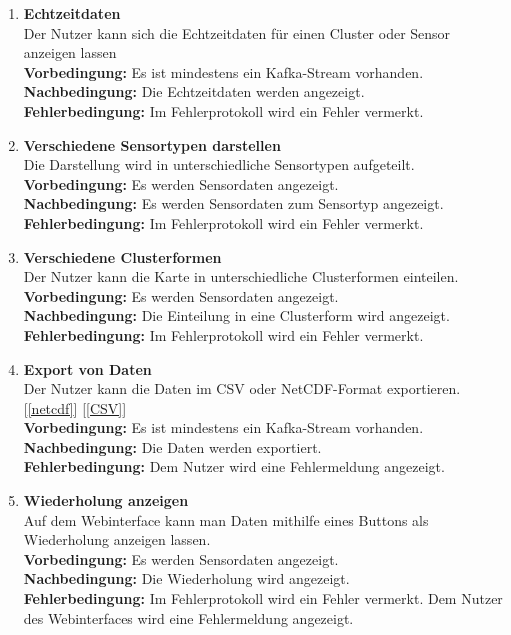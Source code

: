 \begin{enumerate}[label=\textbf{PF\arabic{enumi}0}]
	\item \textbf{Echtzeitdaten}\\
		Der Nutzer kann sich die Echtzeitdaten für einen Cluster oder Sensor anzeigen lassen\\
		\textbf{Vorbedingung:} Es ist mindestens ein Kafka-Stream vorhanden.\\
		\textbf{Nachbedingung:} Die Echtzeitdaten werden angezeigt.\\
		\textbf{Fehlerbedingung:} Im Fehlerprotokoll wird ein Fehler vermerkt.
	 
	 \item \textbf{Verschiedene Sensortypen darstellen}\\
	 	Die Darstellung wird in unterschiedliche Sensortypen aufgeteilt.\\
	 	\textbf{Vorbedingung:} Es werden Sensordaten angezeigt.\\
	 	\textbf{Nachbedingung:} Es werden Sensordaten zum Sensortyp angezeigt.\\
	 	\textbf{Fehlerbedingung:} Im Fehlerprotokoll wird ein Fehler vermerkt.
	 
	 \item \textbf{Verschiedene Clusterformen}\\
	 	Der Nutzer kann die Karte in unterschiedliche Clusterformen einteilen.\\
	 	\textbf{Vorbedingung:} Es werden Sensordaten angezeigt.\\
	 	\textbf{Nachbedingung:} Die Einteilung in eine Clusterform wird angezeigt.\\
	 	\textbf{Fehlerbedingung:} Im Fehlerprotokoll wird ein Fehler vermerkt.
		
	\item \textbf{Export von Daten}\\
		Der Nutzer kann die Daten im CSV oder NetCDF-Format exportieren.[\ref{netcdf}] [\ref{CSV}]\\
		\textbf{Vorbedingung:} Es ist mindestens ein Kafka-Stream vorhanden.\\
		\textbf{Nachbedingung:} Die Daten werden exportiert.\\
		\textbf{Fehlerbedingung:} Dem Nutzer wird eine Fehlermeldung angezeigt.
		
	\item \textbf{Wiederholung anzeigen} \label{wiederhol}\\
		Auf dem Webinterface kann man Daten mithilfe eines Buttons als Wiederholung anzeigen lassen.\\
		\textbf{Vorbedingung:} Es werden Sensordaten angezeigt.\\
		\textbf{Nachbedingung:} Die Wiederholung wird angezeigt.\\
		\textbf{Fehlerbedingung:} Im Fehlerprotokoll wird ein Fehler vermerkt. Dem Nutzer des Webinterfaces wird eine Fehlermeldung angezeigt.
		


\end{enumerate}

